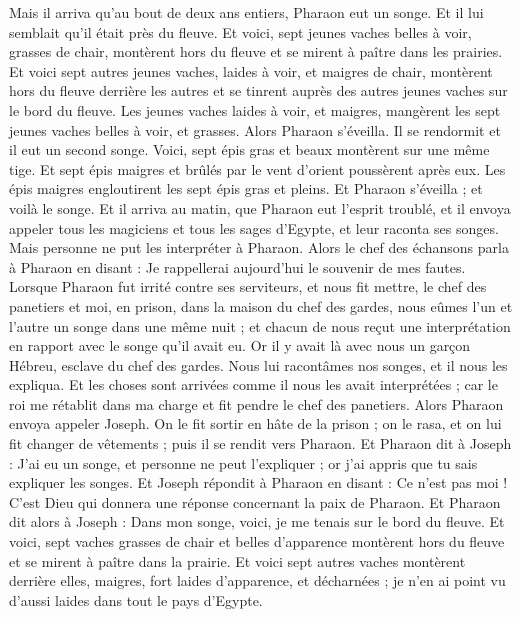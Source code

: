 \begin{multicols}{2}
\VerseOne{}Mais il arriva qu'au bout de deux ans entiers, Pharaon eut un songe. Et il lui semblait qu'il était près du fleuve.
Et voici, sept jeunes vaches belles à voir, grasses de chair, montèrent hors du fleuve et se mirent à paître dans les prairies.
Et voici sept autres jeunes vaches, laides à voir, et maigres de chair, montèrent hors du fleuve derrière les autres et se tinrent auprès des autres jeunes vaches sur le bord du fleuve.
Les jeunes vaches laides à voir, et maigres, mangèrent les sept jeunes vaches belles à voir, et grasses. Alors Pharaon s'éveilla.
Il se rendormit et il eut un second songe. Voici, sept épis gras et beaux montèrent sur une même tige.
Et sept épis maigres et brûlés par le vent d'orient poussèrent après eux.
Les épis maigres engloutirent les sept épis gras et pleins. Et Pharaon s'éveilla ; et voilà le songe.
Et il arriva au matin, que Pharaon eut l'esprit troublé, et il envoya appeler tous les magiciens et tous les sages d'Egypte, et leur raconta ses songes. Mais personne ne put les interpréter à Pharaon.
Alors le chef des échansons parla à Pharaon en disant : Je rappellerai aujourd'hui le souvenir de mes fautes.
Lorsque Pharaon fut irrité contre ses serviteurs, et nous fit mettre, le chef des panetiers et moi, en prison, dans la maison du chef des gardes,
nous eûmes l'un et l'autre un songe dans une même nuit ; et chacun de nous reçut une interprétation en rapport avec le songe qu'il avait eu.
Or il y avait là avec nous un garçon Hébreu, esclave du chef des gardes. Nous lui racontâmes nos songes, et il nous les expliqua.
Et les choses sont arrivées comme il nous les avait interprétées ; car le roi me rétablit dans ma charge et fit pendre le chef des panetiers.
Alors Pharaon envoya appeler Joseph. On le fit sortir en hâte de la prison ; on le rasa, et on lui fit changer de vêtements ; puis il se rendit vers Pharaon.
Et Pharaon dit à Joseph : J'ai eu un songe, et personne ne peut l'expliquer ; or j'ai appris que tu sais expliquer les songes.
Et Joseph répondit à Pharaon en disant : Ce n'est pas moi ! C'est Dieu qui donnera une réponse concernant la paix de Pharaon.
Et Pharaon dit alors à Joseph : Dans mon songe, voici, je me tenais sur le bord du fleuve.
Et voici, sept vaches grasses de chair et belles d'apparence montèrent hors du fleuve et se mirent à paître dans la prairie.
Et voici sept autres vaches montèrent derrière elles, maigres, fort laides d'apparence, et décharnées ; je n'en ai point vu d'aussi laides dans tout le pays d'Egypte.

\end{multicols}

